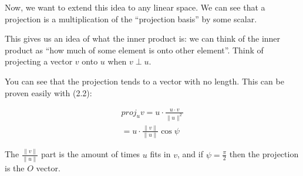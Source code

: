 \documentclass{book}
\begin{document}
Now, we want to extend this idea to any linear space. We can see that a
projection is a multiplication of the ``projection basis'' by some scalar.

This gives us an idea of what the inner product is: we can think of the inner
product as ``how much of some element is onto other element''. Think of
projecting a vector $v$ onto $u$ when $v\perp u$.

\begin{center}
\end{center}

You can see that the projection tends to a vector with no length. This can be
proven easily with (2.2):

\begin{equation}
    \begin{split}
        proj_u v = u\cdot\frac{u\cdot v}{\|u\|^{2}}
        \\ = u\cdot\frac{\|v\|}{\|u\|} \cos\psi
    \end{split}
\end{equation}

The $\frac{\|v\|}{\|u\|}$ part is the amount of times $u$ fits in $v$, and if
$\psi = \frac{\pi}{2}$ then the projection is the $O$ vector.
\end{document}
